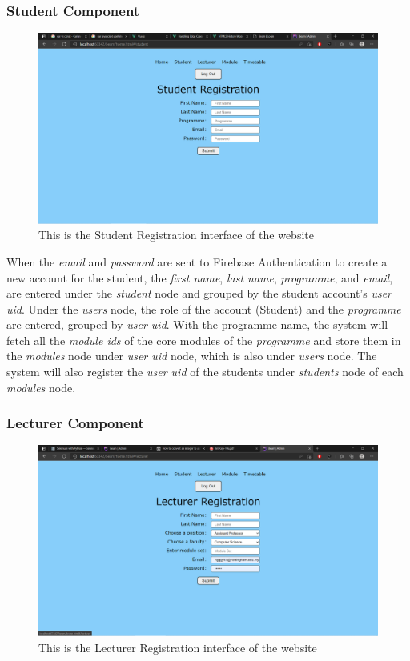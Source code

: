 \documentclass[../report.tex]{subfiles}
\begin{document}
\subsubsection{Student Component}
\begin{figure}[H]
	\centering
	\includegraphics[width=.7\linewidth]{../images/07/01-03-student-reg.png}
	\caption{This is the Student Registration interface of the website}
	\label{fig:07-01-03-student}
\end{figure}



When the \textit{email} and \textit{password} are sent to Firebase Authentication to create a new account for the student, the \textit{first name}, \textit{last name}, \textit{programme}, and \textit{email}, are entered under the \textit{student} node and grouped by the student account’s \textit{user uid}. Under the \textit{users} node, the role of the account (Student) and the \textit{programme} are entered, grouped by \textit{user uid}. With the programme name, the system will fetch all the \textit{module ids} of the core modules of the \textit{programme} and store them in the \textit{modules} node under \textit{user uid} node, which is also under \textit{users} node. The system will also register the \textit{user uid} of the students under \textit{students} node of each \textit{modules} node.

\bigskip
\subsubsection{Lecturer Component}
\begin{figure}[H]
	\centering
	\includegraphics[width=.7\linewidth]{../images/07/01-04-lecturer-reg.png}
	\caption{This is the Lecturer Registration interface of the website}
	\label{fig:07-01-04-lecturer}
\end{figure}
\end{document}
